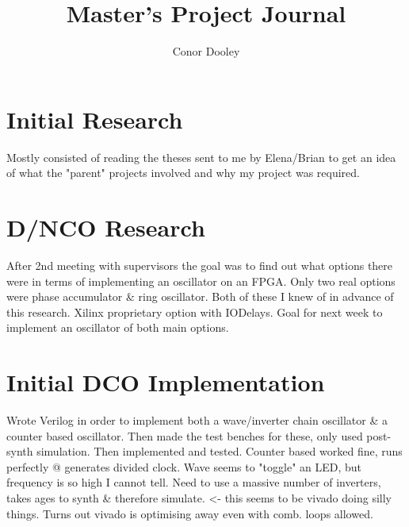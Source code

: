 \documentclass[a4paper,12pt]{report}
\begin{document}
\title{Master's Project Journal}
\author{Conor Dooley}
\maketitle
\section*{Initial Research}
Mostly consisted of reading the theses sent to me by Elena/Brian to get an idea of what the "parent" projects involved and why my project was required.
\section*{D/NCO Research}
After 2nd meeting with supervisors the goal was to find out what options there were in terms of implementing an oscillator on an FPGA. Only two real options were phase accumulator \& ring oscillator. Both of these I knew of in advance of this research. Xilinx proprietary option with IODelays. Goal for next week to implement an oscillator of both main options.
\section*{Initial DCO Implementation}
Wrote Verilog in order to implement both a wave/inverter chain oscillator \& a counter based oscillator. Then made the test benches for these, only used post-synth simulation. Then implemented and tested. Counter based worked fine, runs perfectly @ generates divided clock. Wave seems to "toggle" an LED, but frequency is so high I cannot tell. Need to use a massive number of inverters, takes ages to synth \& therefore simulate. <- this seems to be vivado doing silly things. Turns out vivado is optimising away even with comb. loops allowed.
\end{document}
